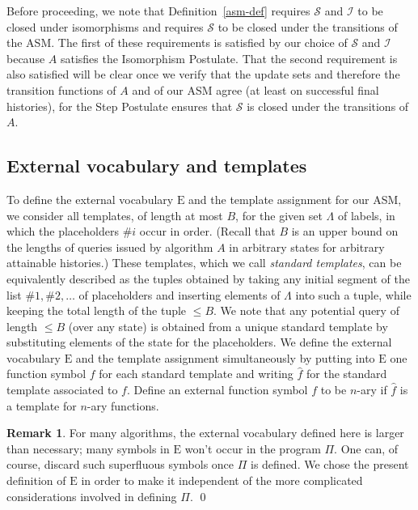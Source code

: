 \documentclass{LMCS}
\theoremstyle{definition}
\newtheorem{rmk}[thm]{Remark}
\newcommand{\E}{\mathrm{E}}
\newcommand{\scr}[1]{\ensuremath{\mathcal {#1}}}
\begin{document}
Before proceeding, we note that Definition~\ref{asm-def} requires \scr
S and \scr I to be closed under isomorphisms and requires \scr S to be
closed under the transitions of the ASM.  The first of these
requirements is satisfied by our choice of \scr S and \scr I because
$A$ satisfies the Isomorphism Postulate.  That the second requirement
is also satisfied will be clear once we verify that the update sets
and therefore the transition functions of $A$ and of our ASM agree (at
least on successful final histories), for the Step Postulate ensures
that \scr S is closed under the transitions of $A$.

\subsection{External vocabulary and templates}
\label{sub:extvoc}

To define the external vocabulary $\E$ and the template assignment for
our ASM, we consider all templates, of length at most $B$, for the
given set $\Lambda$ of labels, in which the placeholders $\#i$ occur
in order.  (Recall that $B$ is an upper bound on the lengths of
queries issued by algorithm $A$ in arbitrary states for arbitrary
attainable histories.)  These templates, which we call \emph{standard
templates}, can be equivalently described as the tuples obtained by
taking any initial segment of the list $\#1,\#2,\dots$ of placeholders
and inserting elements of $\Lambda$ into such a tuple, while keeping
the total length of the tuple $\leq B$.  We note that any potential
query of length $\leq B$ (over any state) is obtained from a unique
standard template by substituting elements of the state for the
placeholders.  We define the external vocabulary $\E$ and the template
assignment simultaneously by putting into $\E$ one function symbol $f$
for each standard template and writing $\hat f$ for the standard
template associated to $f$.  Define an external function symbol $f$ to
be $n$-ary if $\hat f$ is a template for $n$-ary functions.

\begin{rmk}
For many algorithms, the external vocabulary defined here is larger
than necessary; many symbols in $\E$ won't occur in the program $\Pi$.
One can, of course, discard such superfluous symbols once $\Pi$ is
defined.  We chose the present definition of $\E$ in order to make it
independent of the more complicated considerations involved in
defining $\Pi$.  
\qed\end{rmk}
\end{document}
